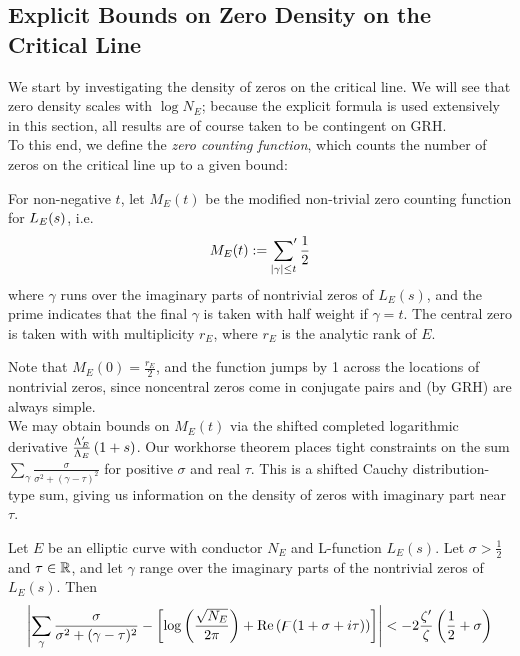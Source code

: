 \subsection{Explicit Bounds on Zero Density on the Critical Line}

We start by investigating the density of zeros on the critical line. We will see that zero density scales with $\log N_E$; because the explicit formula is used extensively in this section, all results are of course taken to be contingent on GRH. \\

To this end, we define the {\it zero counting function}, which counts the number of zeros on the critical line up to a given bound:
\begin{definition}\label{defn:zero_counting_function}
For non-negative $t$, let $M_E(t)$ be the modified non-trivial zero counting function for $L_E(s)$, i.e.
\begin{equation}
M_E(t) := \sideset{}{^{\prime}}\sum_{|\gamma| \le t} \frac{1}{2}
\end{equation}
where $\gamma$ runs over the imaginary parts of nontrivial zeros of $L_E(s)$, and the prime indicates that the final $\gamma$ is taken with half weight if $\gamma = t$. The central zero is taken with with multiplicity $r_E$, where $r_E$ is the analytic rank of $E$.
\end{definition}

Note that $M_E(0) = \frac{r_E}{2}$, and the function jumps by 1 across the locations of nontrivial zeros, since noncentral zeros come in conjugate pairs and (by GRH) are always simple. \\

%

We may obtain bounds on $M_E(t)$ via the shifted completed logarithmic derivative $\frac{\Lambda_E^{\prime}}{\Lambda_E}\left(1+s\right)$. Our workhorse theorem places tight constraints on the sum $\sum_\gamma \frac{\sigma}{\sigma^2+(\gamma-\tau)^2}$ for positive $\sigma$ and real $\tau$. This is a shifted Cauchy distribution-type sum, giving us information on the density of zeros with imaginary part near $\tau$.
\begin{theorem}\label{thm:poisson_sum_bound}
Let $E$ be an elliptic curve with conductor $N_E$ and L-function $L_E(s)$. Let $\sigma > \frac{1}{2}$ and $\tau \in \mathbb{R}$, and let $\gamma$ range over the imaginary parts of the nontrivial zeros of $L_E(s)$. Then
\begin{equation}
 \left| \sum_\gamma \frac{\sigma}{\sigma^2+(\gamma-\tau)^2} - \left[\log\left(\frac{\sqrt{N_E}}{2\pi}\right) + \mbox{\rm Re}\left(\digamma(1+\sigma+i \tau)\right)\right] \right| < - 2\frac{\zeta^{\prime}}{\zeta}\left(\frac{1}{2}+\sigma\right)
\end{equation}
\end{theorem}


